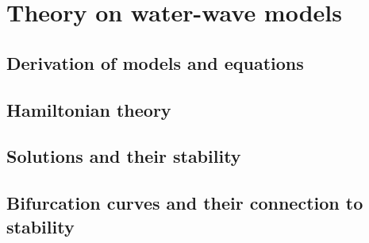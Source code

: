 \chapter{Theory on water-wave models}



\section{Derivation of models and equations}






\section{Hamiltonian theory}





\section{Solutions and their stability}




\section{Bifurcation curves and their connection to stability}
